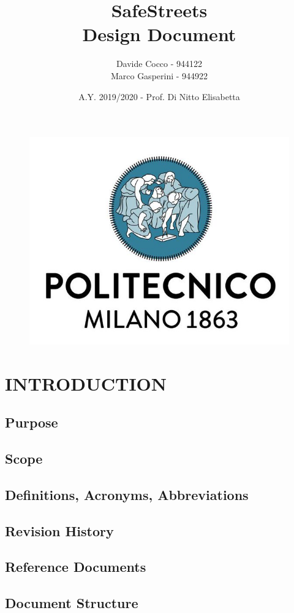 \documentclass[12pt,a4paper]{article}
\author{Davide Cocco - 944122\\
	Marco Gasperini - 944922}
\date{A.Y. 2019/2020 - Prof. Di Nitto Elisabetta}
\title{
	\textbf{\Huge{SafeStreets}} \\
	\large Design Document
}
\begin{document}
	\begin{figure}
		\centering
		\includegraphics[width=1.0\linewidth]{Images/polimi.jpg}
	\end{figure}

	\maketitle
	\newpage
	\tableofcontents
	\newpage

\section{INTRODUCTION}
\subsection{Purpose}
\subsection{Scope}
\subsection{Definitions, Acronyms, Abbreviations}
\subsection{Revision History}
\subsection{Reference Documents}
\subsection{Document Structure}
\end{document}
